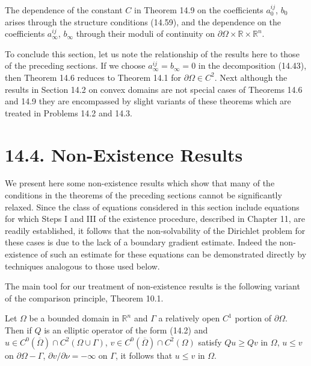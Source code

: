 The dependence of the constant $C$ in Theorem 14.9 on the coefficients $a^{ij}_0$, $b_0$
arises through the structure conditions (14.59), and the dependence on the coefficients
$a^{ij}_\infty$, $b_\infty$ through their moduli of continuity on $\partial\Omega \times \mathbb{R} \times \mathbb{R}^n$.

To conclude this section, let us note the relationship of the results here to those
of the preceding sections. If we choose $a^{ij}_\infty = b_\infty = 0$ in the decomposition (14.43),
then Theorem 14.6 reduces to Theorem 14.1 for $\partial\Omega \in C^2$. Next although the results
in Section 14.2 on convex domains are not special cases of Theorems 14.6 and 14.9
they are encompassed by slight variants of these theorems which are treated in
Problems 14.2 and 14.3.





\section*{14.4. Non-Existence Results}

We present here some non-existence results which show that many of the conditions in the theorems of the preceding sections cannot be significantly relaxed. Since the class of equations considered in this section include equations for which Steps I and III of the existence procedure, described in Chapter 11, are readily established, it follows that the non-solvability of the Dirichlet problem for these cases is due to the lack of a boundary gradient estimate. Indeed the non-existence of such an estimate for these equations can be demonstrated directly by techniques analogous to those used below.

The main tool for our treatment of non-existence results is the following variant of the comparison principle, Theorem 10.1.

\begin{theorem}[14.10]\label{gt14-boundary-gradient-14-10}
Let $\Omega$ be a bounded domain in $\mathbb{R}^n$ and $\Gamma$ a relatively open $C^1$ portion of $\partial\Omega$. Then if $Q$ is an elliptic operator of the form (14.2) and $u \in C^0(\overline{\Omega}) \cap C^2(\Omega \cup \Gamma)$, $v \in C^0(\overline{\Omega}) \cap C^2(\Omega)$ satisfy $Qu \ge Qv$ in $\Omega$, $u \le v$ on $\partial\Omega - \Gamma$, $\partial v/\partial \nu = -\infty$ on $\Gamma$, it follows that $u \le v$ in $\Omega$.
\end{theorem}

